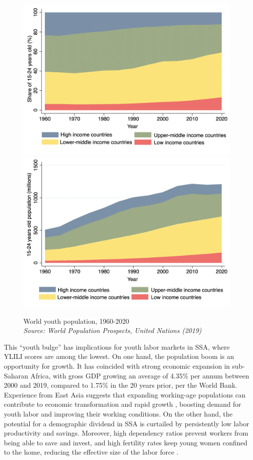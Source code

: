 \documentclass[
  a4paper, twoside, 12pt]{book}
\begin{document}
\begin{figure}[H]

{\centering \includegraphics[width=0.49\linewidth,]{figures/relative_population} \includegraphics[width=0.49\linewidth,]{figures/total_population} 

}

\caption[World youth population, 1960-2020]{World youth population, 1960-2020 \\ \textit{\footnotesize{Source: World Population Prospects, United Nations (2019)}}}\label{fig:fig-youthpop}
\end{figure}

This ``youth bulge'' has implications for youth labor markets in SSA, where YLILI scores are among the lowest. On one hand, the population boom is an opportunity for growth. It has coincided with strong economic expansion in sub-Saharan Africa, with gross GDP growing an average of 4.35\% per annum between 2000 and 2019, compared to 1.75\% in the 20 years prior, per the World Bank. Experience from East Asia suggests that expanding working-age populations can contribute to economic transformation and rapid growth \autocite{bloom1998}, boosting demand for youth labor and improving their working conditions. On the other hand, the potential for a demographic dividend in SSA is curtailed by persistently low labor productivity and savings. Moreover, high dependency ratios prevent workers from being able to save and invest, and high fertility rates keep young women confined to the home, reducing the effective size of the labor force \autocite{eastwood2011}.
\end{document}
